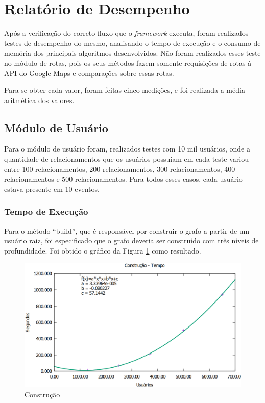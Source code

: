\section{Relatório de Desempenho}

Após a verificação do correto fluxo que o \textit{framework} executa, foram realizados testes de desempenho do mesmo, analisando o tempo de execução e o consumo de memória dos principais algoritmos desenvolvidos. Não foram realizados esses teste no módulo de rotas, pois os seus métodos fazem somente requisições de rotas à API do Google Maps e comparações sobre essas rotas.

Para se obter cada valor, foram feitas cinco medições, e foi realizada a média aritmética dos valores.

\subsection{Módulo de Usuário}

Para o módulo de usuário foram, realizados testes com 10 mil usuários, onde a quantidade de relacionamentos que os usuários possuíam em cada teste variou entre 100 relacionamentos, 200 relacionamentos, 300 relacionamentos, 400 relacionamentos e 500 relacionamentos. Para todos esses casos, cada usuário estava presente em 10 eventos.

\subsubsection{Tempo de Execução}

Para o método ``build'', que é responsável por construir o grafo a partir de um usuário raiz, foi especificado que o grafo deveria ser construído com três níveis de profundidade. Foi obtido o gráfico da Figura \ref{build_tempo} como resultado.

\begin{figure}[!h]
	\centering
	\includegraphics[scale=0.55]{figuras/resultados/graficos/construcao_tempo.eps}
	\caption[Construção]{Construção}
	\label{build_tempo}
\end{figure}


